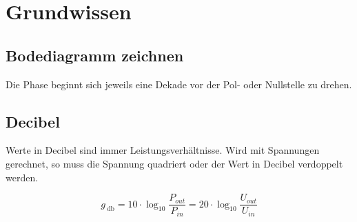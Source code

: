 \section{Grundwissen}

\subsection{Bodediagramm zeichnen}
\medskip%

Die Phase beginnt sich jeweils eine Dekade vor der Pol- oder Nullstelle zu drehen.

\subsection{Decibel}
Werte in Decibel sind immer Leistungsverhältnisse. 
Wird mit Spannungen gerechnet, so muss die Spannung quadriert oder der Wert in Decibel verdoppelt werden.

\[
    g_{\qty{}{\decibel}} = 10 \cdot \log_{10} \frac{P_{out}}{P_{in}} = 20 \cdot \log_{10} \frac{U_{out}}{U_{in}}
\]


